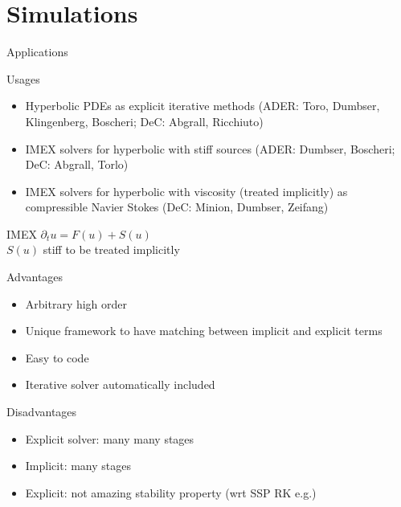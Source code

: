 \documentclass[9pt,compress,t,aspectratio=169]{beamer}
\begin{document}
\section{Simulations}

\begin{frame}{Applications}
	\begin{minipage}{0.48\textwidth}
		\begin{block}{Usages}
			\begin{itemize}
				\item Hyperbolic PDEs as explicit iterative methods
				 (ADER: Toro, Dumbser, Klingenberg, Boscheri; DeC: Abgrall, Ricchiuto)
				\item IMEX solvers for hyperbolic with stiff sources (ADER: Dumbser, Boscheri; DeC: Abgrall, Torlo)
				\item IMEX solvers for hyperbolic with viscosity (treated implicitly) as compressible Navier Stokes (DeC: Minion, Dumbser, Zeifang)
			\end{itemize}
		\end{block}
		\begin{block}{IMEX}
			$\partial_t u = F(u) + S(u)$ \\ $S(u)$ stiff to be treated implicitly
		\end{block}
	\end{minipage}\hfill
	\begin{minipage}{0.48\textwidth}
		\begin{block}{Advantages}
			\begin{itemize}
				\item Arbitrary high order
				\item Unique framework to have matching between implicit and explicit terms
				\item Easy to code
				\item Iterative solver automatically included
			\end{itemize}
		\end{block}

		\begin{block}{Disadvantages}
			\begin{itemize}
				\item Explicit solver: many many stages
				\item Implicit: many stages
				\item Explicit: not amazing stability property (wrt SSP RK e.g.)
			\end{itemize}
		\end{block}
	\end{minipage}
\end{frame}
\end{document}
